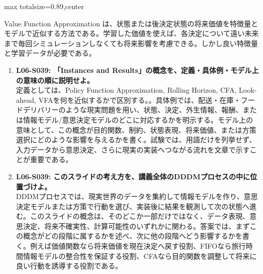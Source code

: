 \begin{minipage}[t]{0.58\textwidth}
\begin{adjustbox}{max totalsize={\textwidth}{0.89\textheight},center}
\begin{minipage}{\textwidth}
Value Function Approximation は、状態または後決定状態の将来価値を特徴量とモデルで近似する方法である。学習した価値を使えば、各決定について遠い未来まで毎回シミュレーションしなくても将来影響を考慮できる。しかし良い特徴量と学習データが必要である。\par{}\begin{enumerate}\item \textbf{L06-S039: 「Instances and Results」の概念を、定義・具体例・モデル上の意味の順に説明せよ。}\\定義としては、Policy Function Approximation, Rolling Horizon, CFA, Look-ahead, VFAを何を近似するかで区別する。。具体例では、配送・在庫・フードデリバリーのような現実問題を用い、状態、決定、外生情報、報酬、または情報モデル/意思決定モデルのどこに対応するかを明示する。モデル上の意味として、この概念が目的関数、制約、状態表現、将来価値、または方策選択にどのような影響を与えるかを書く。試験では、用語だけを列挙せず、入力データから意思決定、さらに現実の実装へつながる流れを文章で示すことが重要である。\item \textbf{L06-S039: このスライドの考え方を、講義全体のDDDMプロセスの中に位置づけよ。}\\DDDMプロセスでは、現実世界のデータを集約して情報モデルを作り、意思決定モデルまたは方策で行動を選び、実装後に結果を観測して次の状態へ進む。このスライドの概念は、そのどこか一部だけではなく、データ表現、意思決定、将来不確実性、計算可能性のいずれかに関わる。答案では、まずこの概念がどの段階に属するかを述べ、次に他の段階へどう影響するかを書く。例えば価値関数なら将来価値を現在決定へ戻す役割、FIFOなら旅行時間情報モデルの整合性を保証する役割、CFAなら目的関数を調整して将来に良い行動を誘導する役割である。\end{enumerate}
\end{minipage}
\end{adjustbox}
\end{minipage}


